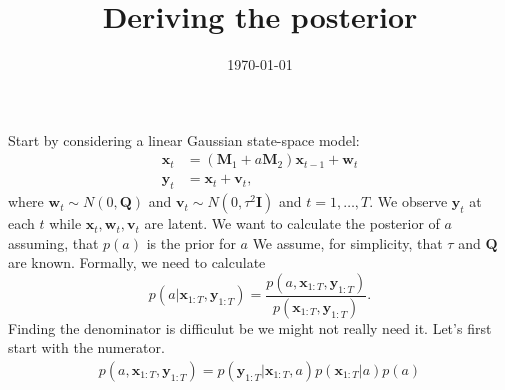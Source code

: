 \documentclass[a4paper,12pt]{article} %
\title{Deriving the posterior}
\date{\today} %
\newcommand{\bx}{\bm{x}}
\newcommand{\by}{\bm{y}}
\newcommand{\bM}{\bm{M}}
\newcommand{\bQ}{\bm{Q}}
\newcommand{\bI}{\bm{I}}
\newcommand{\bw}{\bm{w}}
\newcommand{\bv}{\bm{v}}
\begin{document}
Start by considering a linear Gaussian state-space model:
\begin{align*}
\bx_t &= (\bM_1 + a\bM_2)\bx_{t - 1} + \bw_t\\
\by_t &= \bx_t + \bv_t,
\end{align*}
where $\bw_t \sim N(0, \bQ)$ and $\bv_t \sim N(0, \tau^2\bI)$ and $t = 1, \dots, T$. We observe $\by_t$ at each $t$ while $\bx_t, \bw_t, \bv_t$ are latent. We want to calculate the posterior of $a$ assuming, that $p(a)$ is the prior for $a$ We assume, for simplicity, that $\tau$ and $\bQ$ are known. Formally, we need to calculate
\begin{equation}
  p(a|\bx_{1:T}, \by_{1:T}) = \frac{p(a, \bx_{1:T}, \by_{1:T})}{p(\bx_{1:T}, \by_{1:T})}. 
\end{equation}
Finding the denominator is difficulut be we might not really need it. Let's first start with the numerator.
\begin{multline}
  p(a, \bx_{1:T}, \by_{1:T}) = p(\by_{1:T} | \bx_{1:T}, a) p(\bx_{1:T}|a) p(a)
  \end{multline}
\end{document}
